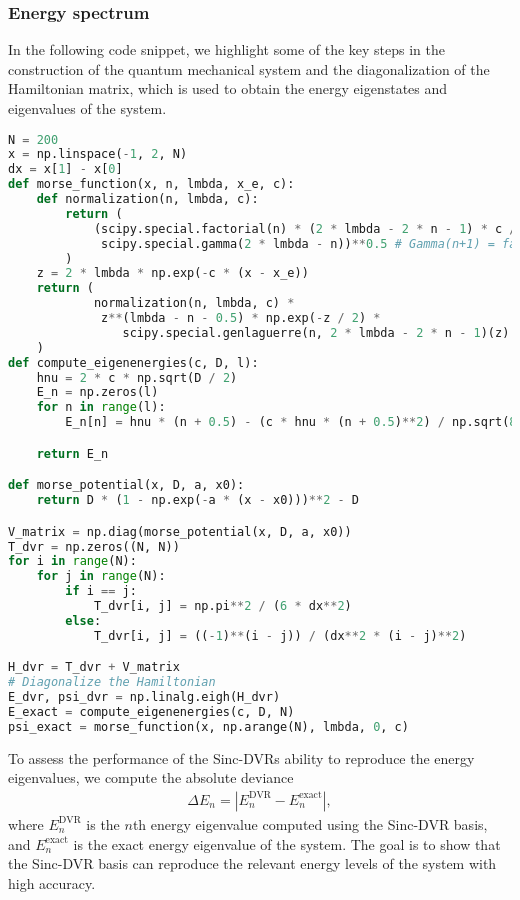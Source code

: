 \documentclass{subfiles}
\begin{document}
\subsubsection*{Energy spectrum} 
In the following code snippet, we highlight some of the key steps in the construction of the quantum mechanical system and the diagonalization of the Hamiltonian matrix, which is used to obtain the energy eigenstates and eigenvalues of the system. 
\begin{lstlisting}[language=Python, label=lst:dvr_validation]
N = 200
x = np.linspace(-1, 2, N)
dx = x[1] - x[0]
def morse_function(x, n, lmbda, x_e, c):
    def normalization(n, lmbda, c):
        return (
            (scipy.special.factorial(n) * (2 * lmbda - 2 * n - 1) * c /
             scipy.special.gamma(2 * lmbda - n))**0.5 # Gamma(n+1) = factorial(n)
        )
    z = 2 * lmbda * np.exp(-c * (x - x_e))
    return (
            normalization(n, lmbda, c) *
             z**(lmbda - n - 0.5) * np.exp(-z / 2) * 
                scipy.special.genlaguerre(n, 2 * lmbda - 2 * n - 1)(z)
    )
def compute_eigenenergies(c, D, l):
    hnu = 2 * c * np.sqrt(D / 2)
    E_n = np.zeros(l)
    for n in range(l):
        E_n[n] = hnu * (n + 0.5) - (c * hnu * (n + 0.5)**2) / np.sqrt(8 * D)

    return E_n

def morse_potential(x, D, a, x0):
    return D * (1 - np.exp(-a * (x - x0)))**2 - D

V_matrix = np.diag(morse_potential(x, D, a, x0))
T_dvr = np.zeros((N, N))
for i in range(N):
    for j in range(N):
        if i == j:
            T_dvr[i, j] = np.pi**2 / (6 * dx**2)
        else:
            T_dvr[i, j] = ((-1)**(i - j)) / (dx**2 * (i - j)**2)

H_dvr = T_dvr + V_matrix
# Diagonalize the Hamiltonian
E_dvr, psi_dvr = np.linalg.eigh(H_dvr)
E_exact = compute_eigenenergies(c, D, N)
psi_exact = morse_function(x, np.arange(N), lmbda, 0, c)
\end{lstlisting}
To assess the performance of the Sinc-DVRs ability to reproduce the energy eigenvalues, we compute the absolute deviance
\begin{align*}
    \Delta E_n = |E_n^{\text{DVR}} - E_n^{\text{exact}}|,
\end{align*}
where $E_n^{\text{DVR}}$ is the $n$th energy eigenvalue computed using the Sinc-DVR basis, and $E_n^{\text{exact}}$ is the exact energy eigenvalue of the system. The goal is to show that the Sinc-DVR basis can reproduce the relevant energy levels of the system with high accuracy.
\end{document}
